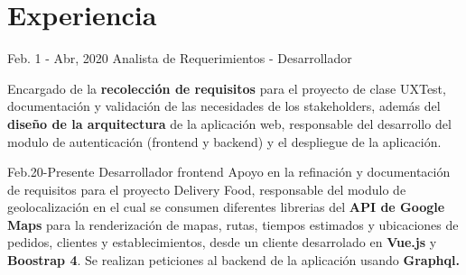 \documentclass[american]{cv-class}
\begin{document}
 



\section{Experiencia}
\begin{entrylist}

	\entry
	{Feb. 1 - Abr, 2020}
	{Analista de Requerimientos - Desarrollador} 
	{ }
	{\justifying 
	    Encargado de la \textbf{recolección de requisitos} para el proyecto de clase UXTest, documentación y validación de las necesidades de los stakeholders, además del  \textbf{diseño de la arquitectura} de la aplicación web, responsable del desarrollo del modulo de autenticación (frontend y backend) y el despliegue de la aplicación.
	
	}
	\entry
	{Feb.20-Presente}
	{Desarrollador frontend}
	{ }
	{\justifying 
	Apoyo en la refinación y documentación de requisitos para el proyecto Delivery Food, responsable del modulo de geolocalización en el cual se consumen diferentes librerias del \textbf{API de Google Maps} para la renderización de mapas, rutas, tiempos estimados y ubicaciones de pedidos, clientes y establecimientos, desde un cliente desarrolado en \textbf{Vue.js} y \textbf{Boostrap 4}. Se realizan peticiones al backend de la aplicación usando \textbf{Graphql.}}
	
	
\end{entrylist}
\end{document}

